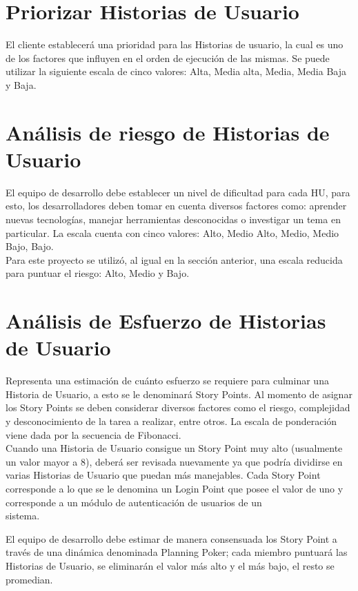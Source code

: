 \section*{Priorizar Historias de Usuario}

El cliente establecerá una prioridad para las Historias de usuario, la cual es uno de los factores que influyen en el orden de ejecución de las mismas. Se puede utilizar la siguiente escala de cinco valores: Alta, Media alta, Media, Media Baja y Baja.

\section*{Análisis de riesgo de Historias de Usuario}

El equipo de desarrollo debe establecer un nivel de dificultad para cada HU, para esto, los desarrolladores deben tomar en cuenta diversos factores como: aprender nuevas tecnologías, manejar herramientas desconocidas o investigar un tema en particular. La escala cuenta con cinco valores: Alto, Medio Alto, Medio, Medio Bajo, Bajo.\\

Para este proyecto se utilizó, al igual en la sección anterior, una escala reducida para puntuar el riesgo: Alto, Medio y Bajo.

\section*{Análisis de Esfuerzo de Historias de Usuario}

Representa una estimación de cuánto esfuerzo se requiere para culminar una Historia de Usuario, a esto se le denominará Story Points. Al momento de asignar los Story Points se deben considerar diversos factores como el riesgo, complejidad  y desconocimiento de la tarea a realizar, entre otros. La escala de ponderación viene dada por la secuencia de Fibonacci.\\

Cuando una Historia de Usuario consigue un Story Point muy alto (usualmente un valor mayor a 8), deberá ser revisada nuevamente ya que podría dividirse en varias Historias de Usuario que puedan más manejables.  Cada Story Point corresponde a lo que se le denomina un Login Point que posee el valor de uno y corresponde a un módulo de autenticación de usuarios de un\\ sistema.

El equipo de desarrollo debe estimar de manera consensuada los Story Point a través de una dinámica denominada Planning Poker; cada miembro puntuará las Historias de Usuario, se eliminarán el valor más alto y el más bajo, el resto se promedian.

